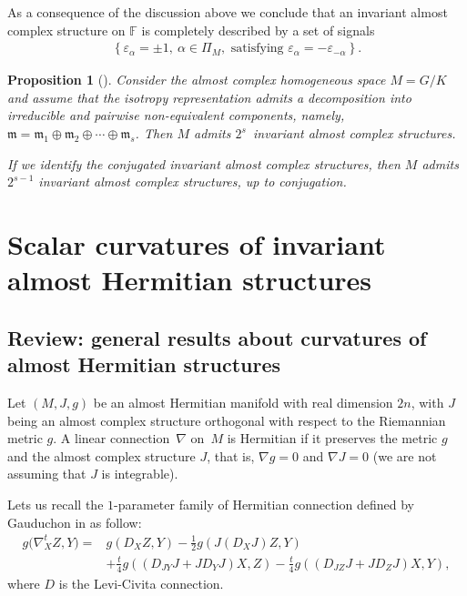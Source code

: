 \documentclass[10pt,a4paper]{amsart}
\numberwithin{equation}{section}
\newtheorem{Proposition}[Theorem]{Proposition}
 { \theoremstyle{definition}
\newtheorem{Definition}[Theorem]{Definition}
\newtheorem{Question}[Theorem]{Question}
\newtheorem*{Notation}{Notation}
\newtheorem{Example}[Theorem]{Example}
\newtheorem{Remark}[Theorem]{Remark} }
\begin{document}
As a consequence of the discussion above we conclude that an invariant almost complex structure on $\mathbb{F}$ is completely described by a set of signals
\begin{gather*}
\left\{\varepsilon_{\alpha}=\pm 1, \ \alpha\in \Pi_M, \text{ satisfying } \varepsilon_{\alpha}=-\varepsilon_{-\alpha}\right\}.
\end{gather*}

\begin{Proposition}[{\cite[Proposition~13.4]{opa}}]%
Consider the almost complex homogeneous space \mbox{$M=G/K$} and assume that the isotropy representation admits a decomposition into irreducible and pairwise non-equivalent components, namely, $\mathfrak{m}=\mathfrak{m}_{1}\oplus\mathfrak{m}_{2}\oplus\cdots\oplus\mathfrak{m}_{s}$. Then $M$ admits $2^{s}$~invariant almost complex structures.

If we identify the conjugated invariant almost complex structures, then $M$ admits $2^{s-1}$ invariant almost complex structures, up to conjugation.
\end{Proposition}

\section{Scalar curvatures of invariant almost Hermitian structures }\label{scal-hermit}

\subsection{Review: general results about curvatures of almost Hermitian structures}
Let $(M,J,g)$ be an almost Hermitian manifold with real dimension $2n$, with $J$ being an almost complex structure orthogonal with respect to the Riemannian metric $g$. A linear connection~$\nabla$ on~$M$ is Hermitian if it preserves the metric $g$ and the almost complex structure $J$, that is, $\nabla g=0$ and $\nabla J=0$ (we are not assuming that $J$ is integrable).

Lets us recall the $1$-parameter family of Hermitian connection defined by Gauduchon in \cite{gau} as follow:{\samepage
\begin{align*}
g\big(\nabla^{t}_{X}Z,Y\big)={}&g(D_{X}Z,Y)-\frac{1}{2}g(J(D_{X}J)Z,Y)
\\
&+\frac{t}{4}g((D_{JY}J+JD_{Y}J)X,Z)-\frac{t}{4}g((D_{JZ}J+JD_{Z}J)X,Y),
\end{align*}
where $D$ is the Levi-Civita connection.}
\end{document}

